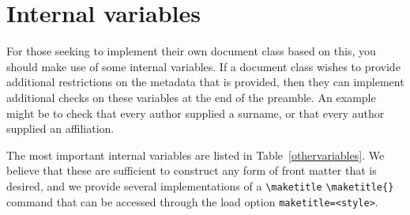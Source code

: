 \documentclass{article}
\newcommand{\cmd}[2][]{%
  \def\FirstArg{#1}%
  \ifx\FirstArg\empty%
    \texttt{\textbackslash{}#2}%
  \else%
    \texttt{\textbackslash{}#2\{#1\}}%
  \fi
}
\begin{document}
\section{Internal variables}\label{variables}
For those seeking to implement their own document class based on this, you should
make use of some internal variables.
If a document class wishes to provide additional restrictions on the
metadata that is provided, then they can implement additional checks
on these variables at the end of the preamble. An example might be to
check that every author supplied a surname, or that every author supplied
an affiliation.

The most important internal variables are listed in
Table~\ref{othervariables}. We believe that these are sufficient to
construct any form of front matter that is desired, and we provide
several implementations of a \cmd{maketitle} command that can be
accessed through the load
option \texttt{maketitle=\textless{style}\textgreater}. 
\end{document}
